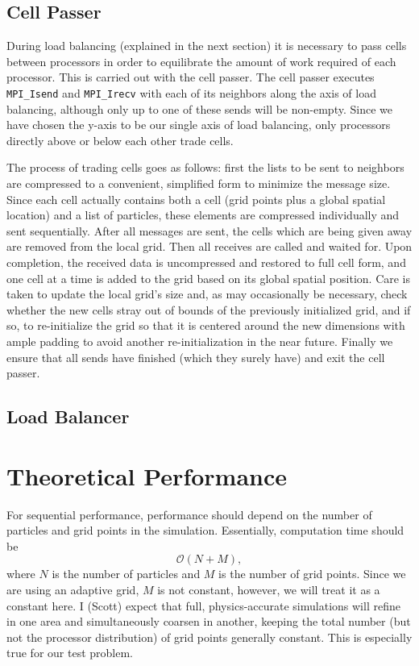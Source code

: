 \documentclass[]{article}
\begin{document}
\subsection{Cell Passer}
During load balancing (explained in the next section) it is necessary to pass cells between processors in order to equilibrate the amount of work required of each processor. This is carried out with the cell passer. The cell passer executes \texttt{MPI\_Isend} and \texttt{MPI\_Irecv} with each of its neighbors along the axis of load balancing, although only up to one of these sends will be non-empty. Since we have chosen the y-axis to be our single axis of load balancing, only processors directly above or below each other trade cells. 

The process of trading cells goes as follows: first the lists to be sent to neighbors are compressed to a convenient, simplified form to minimize the message size. Since each cell actually contains both a cell (grid points plus a global spatial location) and a list of particles, these elements are compressed individually and sent sequentially. After all messages are sent, the cells which are being given away are removed from the local grid. Then all receives are called and waited for. Upon completion, the received data is uncompressed and restored to full cell form, and one cell at a time is added to the grid based on its global spatial position. Care is taken to update the local grid's size and, as may occasionally be necessary, check whether the new cells stray out of bounds of the previously initialized grid, and if so, to re-initialize the grid so that it is centered around the new dimensions with ample padding to avoid another re-initialization in the near future. Finally we ensure that all sends have finished (which they surely have) and exit the cell passer.

\subsection{Load Balancer}


\section{Theoretical Performance}
For sequential performance, performance should depend on the number of particles and grid points in the simulation.  Essentially, computation time should be 
\begin{equation}
\mathcal{O}(N + M),
\end{equation}
where $N$ is the number of particles and $M$ is the number of grid points.  Since we are using an adaptive grid, $M$ is not constant, however, we will treat it as a constant here.  I (Scott) expect that full, physics-accurate simulations will refine in one area and simultaneously coarsen in another, keeping the total number (but not the processor distribution) of grid points generally constant.  This is especially true for our test problem.
\end{document}
